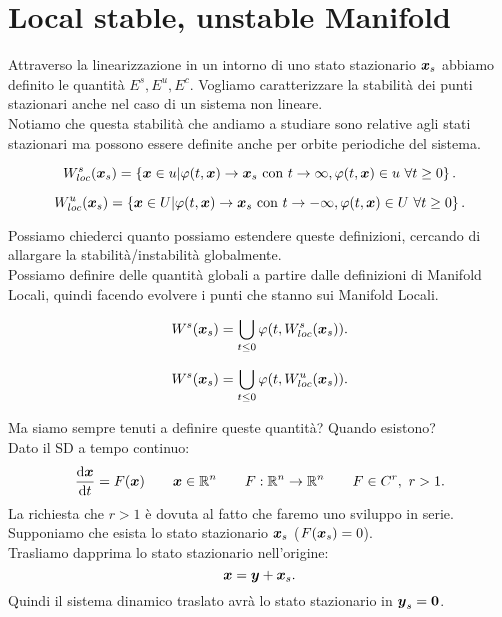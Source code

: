 \section{Local stable, unstable Manifold}%
\label{sub:Local stable, unstable Manifold}
Attraverso la linearizzazione in un intorno di uno stato stazionario $\boldsymbol{x}_s$ abbiamo definito le quantità $E^s, E^u, E^c$. Vogliamo caratterizzare la stabilità dei punti stazionari anche nel caso di un sistema non lineare. \\
Notiamo che questa stabilità che andiamo a studiare sono relative agli stati stazionari ma possono essere definite anche per orbite periodiche del sistema.
\begin{defn}
    \[
	W_{loc}^s(\boldsymbol{x}_s) = \left\{\boldsymbol{x}\in u | \varphi (t, \boldsymbol{x}) \to \boldsymbol{x}_s \text{ con } t\to \infty
	, \varphi (t, \boldsymbol{x}) \in u \ \forall t \ge 0\right\}
    .\] 
\end{defn}
\begin{defn}
    \[
	W_{loc}^u(\boldsymbol{x}_s) = \left\{\boldsymbol{x}\in U | \varphi (t, \boldsymbol{x}) \to \boldsymbol{x}_s \text{ con } t\to -\infty
	, \varphi (t, \boldsymbol{x}) \in U \ \forall t \ge 0\right\}
    .\] 
\end{defn}
\noindent
Possiamo chiederci quanto possiamo estendere queste definizioni, cercando di allargare la stabilità/instabilità globalmente. \\
Possiamo definire delle quantità globali a partire dalle definizioni di Manifold Locali, quindi facendo evolvere i punti che stanno sui Manifold Locali. 
\begin{defn}
    \[
	W^s(\boldsymbol{x}_s) = \bigcup_{t\le 0}\varphi (t, W_{loc}^s(\boldsymbol{x}_s))
    .\] 
\end{defn}
\begin{defn}
    \[
	W^s(\boldsymbol{x}_s) = \bigcup_{t\le 0}\varphi (t, W_{loc}^u(\boldsymbol{x}_s))
    .\] 
\end{defn}
\noindent
Ma siamo sempre tenuti a definire queste quantità? Quando esistono?\\
Dato il SD a tempo continuo:
\[
    \frac{\text{d} \boldsymbol{x}}{\text{d} t} = F(\boldsymbol{x}) \qquad  \boldsymbol{x}\in \mathbb{R}^n \qquad  F:\mathbb{R}^n\to \mathbb{R}^n 
    \qquad  F\in C^r, \ r > 1
.\] 
La richiesta che $r>1$ è dovuta al fatto che faremo uno sviluppo in serie. Supponiamo che esista lo stato stazionario $\boldsymbol{x}_s$ ($F(\boldsymbol{x}_s) = 0$). \\
Trasliamo dapprima lo stato stazionario nell'origine:
\[
    \boldsymbol{x} = \boldsymbol{y}+\boldsymbol{x}_s
.\] 
Quindi il sistema dinamico traslato avrà lo stato stazionario in $\boldsymbol{y}_s=\boldsymbol{0}$.
